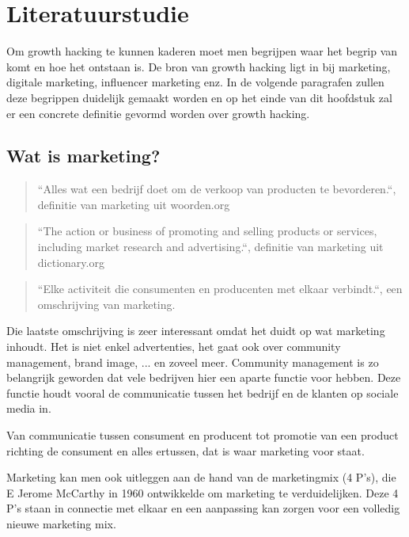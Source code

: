 \chapter{Literatuurstudie} \label{ch:stand-van-zaken}


Om growth hacking te kunnen kaderen moet men begrijpen waar het begrip van komt en hoe het ontstaan is. De bron van growth hacking ligt in bij marketing, digitale marketing, influencer marketing enz. In de volgende paragrafen zullen deze begrippen duidelijk gemaakt worden en op het einde van dit hoofdstuk zal er een concrete definitie gevormd worden over growth hacking.

\section{Wat is marketing?} \label{sec:marketing}
\begin{quote}
	``Alles wat een bedrijf doet om de verkoop van producten te bevorderen.``, definitie van marketing uit woorden.org
\end{quote}
\begin{quote}
	``The action or business of promoting and selling products or services, including market research and advertising.``, definitie van marketing uit dictionary.org
\end{quote}
\begin{quote}
``Elke activiteit die consumenten en producenten met elkaar verbindt.``, een omschrijving van marketing.
\end{quote}

Die laatste omschrijving is zeer interessant omdat het duidt op wat marketing inhoudt. Het is niet enkel advertenties, het gaat ook over community management, brand image, ... en zoveel meer. Community management is zo belangrijk geworden dat vele bedrijven hier een aparte functie voor hebben. Deze functie houdt vooral de communicatie tussen het bedrijf en de klanten op sociale media in. 

Van communicatie tussen consument en producent tot promotie van een product richting de consument en alles ertussen, dat is waar marketing voor staat.

Marketing kan men ook uitleggen aan de hand van de marketingmix (4 P's), die E Jerome McCarthy in 1960 ontwikkelde om marketing te verduidelijken. Deze 4 P's staan in connectie met elkaar en een aanpassing kan zorgen voor een volledig nieuwe marketing mix.~\autocite{Forsey2019}

